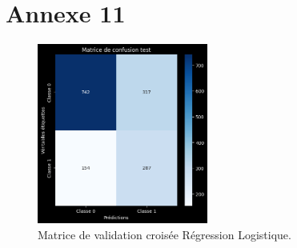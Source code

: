 \section*{Annexe 11}
\label{sec:annexe11}
\begin{figure}[H]
\centering
\includegraphics[width=0.5\textwidth]{figures/MatriceValANNEXE11.png}
\caption{Matrice de validation croisée Régression Logistique.}
\label{fig:annexe11}
\end{figure}
